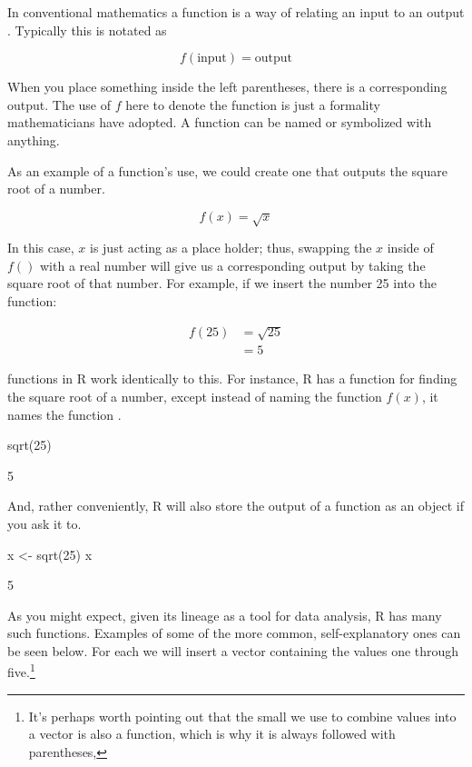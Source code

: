 In conventional mathematics a function is a way of relating an input to an output \parencite{Pierce2022}.  Typically this is notated as

\begin{equation} %
f(\text{input}) = \text{output}
\end{equation}

\noindent
When you place something inside the left parentheses, there is a corresponding output. The use of $f$ here to denote the function is just a formality mathematicians have adopted.  A function can be named or symbolized with anything.  

As an example of a function's use, we could create one that outputs the square root of a number.

\begin{equation}
f(x) = \sqrt{x}
\end{equation}

\noindent
In this case, $x$ is just acting as a place holder; thus, swapping the $x$ inside of $f()$ with a real number will give us a corresponding output by taking the square root of that number. For example, if we insert the number 25 into the function:

\begin{equation}
\begin{split}
f(25) &= \sqrt{25} \\
&= 5
\end{split}
\end{equation}

\noindent
\Glspl{function} in R work identically to this.  For instance, R has a function for finding the square root of a number, except instead of naming the function $f(x)$, it names the function .  

\begin{inR}
sqrt(25)
\end{inR}
\begin{outR}
[1] 5
\end{outR}

\noindent
And, rather conveniently, R will also store the output of a function as an object if you ask it to.
\begin{inR}
x <- sqrt(25)
x
\end{inR}
\begin{outR}
[1] 5
\end{outR}


As you might expect, given its lineage as a tool for data analysis, R has many such functions.  Examples of some of the more common, self-explanatory ones can be seen below. For each we will insert a vector containing the values one through five.\footnote{It's perhaps worth pointing out that the small  we use to combine values into a vector is also a function, which is why it is always followed with parentheses, }

